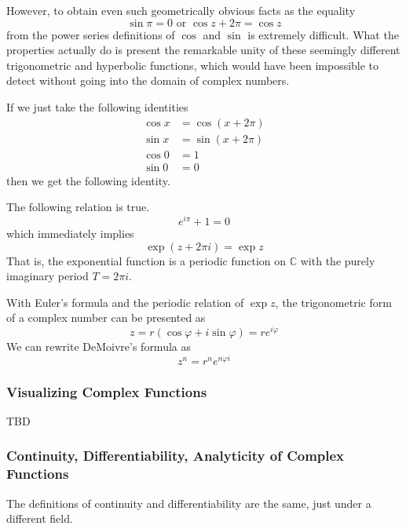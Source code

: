 \documentclass{article}
\begin{document}
      However, to obtain even such geometrically obvious facts as the equality
      \[\sin{\pi} = 0 \text{ or } \cos{z + 2\pi} = \cos{z}\]
      from the power series definitions of $\cos$ and $\sin$ is extremely difficult. What the properties actually do is present the remarkable unity of these seemingly different trigonometric and hyperbolic functions, which would have been impossible to detect without going into the domain of complex numbers. 

      If we just take the following identities
      \begin{align*}
          \cos{x} & = \cos{(x + 2 \pi)} \\
          \sin{x} & = \sin{(x + 2\pi)} \\
          \cos{0} & = 1 \\
          \sin{0} & = 0
      \end{align*}
      then we get the following identity. 

      \begin{theorem}
      The following relation is true. 
      \[e^{i\pi} + 1 = 0\]
      which immediately implies 
      \[\exp(z + 2\pi i) = \exp{z}\]
      That is, the exponential function is a periodic function on $\mathbb{C}$ with the purely imaginary period $T = 2 \pi i$. 
      \end{theorem}

      \begin{corollary}
      With Euler's formula and the periodic relation of $\exp{z}$, the trigonometric form of a complex number can be presented as
      \[z = r(\cos{\varphi} + i \sin{\varphi}) = r e^{i \varphi}\]
      We can rewrite DeMoivre's formula as
      \[z^n = r^n e^{n \varphi i}\]
      \end{corollary}

      \subsubsection{Visualizing Complex Functions}

        TBD

      \subsubsection{Continuity, Differentiability, Analyticity of Complex Functions}
      The definitions of continuity and differentiability are the same, just under a different field. 
\end{document}
